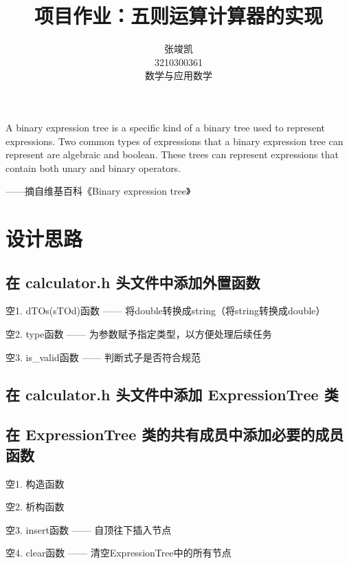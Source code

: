\documentclass[UTF8]{ctexart}
\title{项目作业：五则运算计算器的实现}
\author{张竣凯 \\ 3210300361 \\ 数学与应用数学}
\begin{document}
\maketitle

A binary expression tree is a specific kind of a binary tree used to represent expressions. Two common types of expressions that a binary expression tree can represent are algebraic and boolean. These trees can represent expressions that contain both unary and binary operators.

\begin{flushright}
——摘自维基百科《Binary expression tree》
\end{flushright}

\section{设计思路}

\subsection{在 calculator.h 头文件中添加外置函数}

\hphantom 空1. dTOs(sTOd)函数 —— 将double转换成string（将string转换成double）\newline

\hphantom 空2. type函数 —— 为参数赋予指定类型，以方便处理后续任务\newline

\hphantom 空3. is\_valid函数 —— 判断式子是否符合规范

\subsection{在 calculator.h 头文件中添加 ExpressionTree 类}

\subsection{在 ExpressionTree 类的共有成员中添加必要的成员函数}
\hphantom 空1. 构造函数\newline

\hphantom 空2. 析构函数\newline

\hphantom 空3. insert函数 —— 自顶往下插入节点\newline

\hphantom 空4. clear函数 —— 清空ExpressionTree中的所有节点\newline
\end{document}
